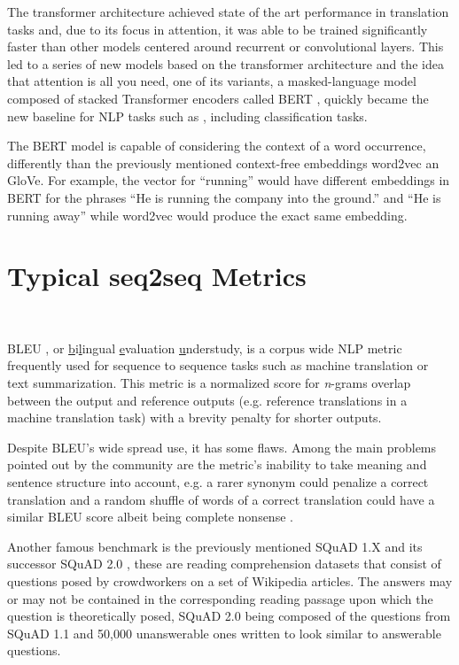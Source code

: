 The transformer architecture achieved state of the art performance in translation tasks and, due to its focus in attention, it was able to be trained significantly faster than other models centered around recurrent or convolutional layers. This led to a series of new models based on the transformer architecture and the idea that attention is all you need,  one of its variants, a masked-language model composed of stacked Transformer encoders called BERT \citep{BERT}, quickly became the new baseline for NLP tasks such as \citep{rogers-etal-2020-primer}, including classification tasks.

The BERT model is capable of considering the context of a word occurrence, differently than the previously mentioned context-free embeddings word2vec an GloVe. For example, the vector for ``running'' would have different embeddings in BERT for the phrases ``He is running the company into the ground.'' and ``He is running away'' while word2vec would produce the exact same embedding.




\section{Typical seq2seq Metrics}
~\label{sec:bleu}


BLEU \citep{bleu}, or \underline{b}i\underline{l}ingual \underline{e}valuation \underline{u}nderstudy, is a corpus wide NLP metric frequently used for sequence to sequence tasks such as machine translation or text summarization. This metric is a normalized score for \textit{n}-grams overlap between the output and reference outputs (e.g. reference translations in a machine translation task) with a brevity penalty for shorter outputs.

Despite BLEU's wide spread use, it has some flaws. Among the main problems pointed out by the community are the metric's inability to take meaning and sentence structure into account, e.g. a rarer synonym could penalize a correct translation and a random shuffle of words of a correct translation could have a similar BLEU score albeit being complete nonsense \citep{bleu_shuffle}.


Another famous benchmark is the previously mentioned SQuAD 1.X \citep{squad1} and its successor SQuAD 2.0 \citep{squad2}, these are reading comprehension datasets that consist of questions posed by crowdworkers on a set of Wikipedia articles. The answers may or may not be contained in the corresponding reading passage upon which the question is theoretically posed, SQuAD 2.0 being composed of the questions from SQuAD 1.1 and 50,000 unanswerable ones written to look similar to answerable questions.
